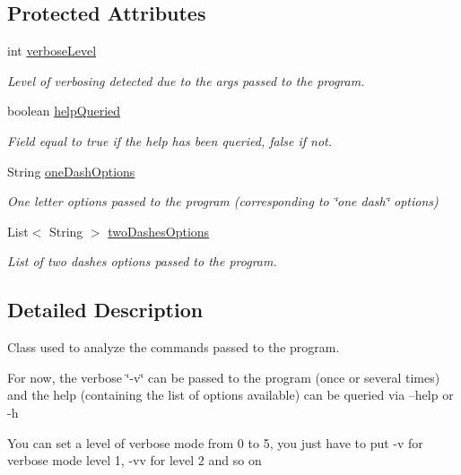 \subsection*{Protected Attributes}
\begin{DoxyCompactItemize}
\item 
int \hyperlink{classdebug_1_1_cli_options_a3a7a5235344ee51904e2314dd5fbf7ec}{verbose\-Level}
\begin{DoxyCompactList}\small\item\em Level of verbosing detected due to the args passed to the program. \end{DoxyCompactList}\item 
boolean \hyperlink{classdebug_1_1_cli_options_a226c64b5f481ade53599280070c24cf0}{help\-Queried}
\begin{DoxyCompactList}\small\item\em Field equal to true if the help has been queried, false if not. \end{DoxyCompactList}\item 
String \hyperlink{classdebug_1_1_cli_options_af118f8dc0f511ad69a7d3889d207a6f3}{one\-Dash\-Options}
\begin{DoxyCompactList}\small\item\em One letter options passed to the program (corresponding to \char`\"{}one dash\char`\"{} options) \end{DoxyCompactList}\item 
List$<$ String $>$ \hyperlink{classdebug_1_1_cli_options_af52ecd6d0cb0cafd69f80f311e7d77d4}{two\-Dashes\-Options}
\begin{DoxyCompactList}\small\item\em List of two dashes options passed to the program. \end{DoxyCompactList}\end{DoxyCompactItemize}


\subsection{Detailed Description}
Class used to analyze the commands passed to the program. 

For now, the verbose \char`\"{}-\/v\char`\"{} can be passed to the program (once or several times) and the help (containing the list of options available) can be queried via --help or -\/h 

You can set a level of verbose mode from 0 to 5, you just have to put -\/v for verbose mode level 1, -\/vv for level 2 and so on 

